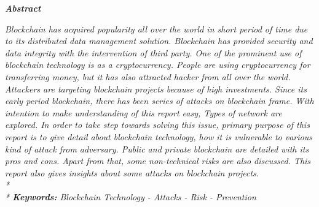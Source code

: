 \documentclass[a4paper,twoside,12pt]{report}
\begin{document}
\begin{spacing}{1.5}
\tableofcontents
\listoftables
\listoffigures
\end{spacing}
\newpage
\begin{spacing}{1}  %
\begingroup
\fontsize{12pt}{14pt}\selectfont
\begin{center}
	\Huge\bfseries
	\textit{Abstract}
\end{center}
\vspace{0.3in}
\textit{\fontsize{10}{10}\selectfont Blockchain has acquired popularity all over the world in short period of time due to its distributed data management solution. Blockchain has provided security and data integrity with the intervention of third party. One of the prominent use of blockchain technology is as a cryptocurrency. People are using cryptocurrency for transferring money, but it has also attracted hacker from all over the world. Attackers are targeting blockchain projects because of high investments. Since its early period blockchain, there has been series of attacks on blockchain frame. With intention to make understanding of this report easy, Types of network are explored. In order to take step towards solving this issue, primary purpose of this report is to give detail about blockchain technology, how it is vulnerable to various kind of attack from adversary. Public and private blockchain are detailed with its pros and cons. Apart from that, some non-technical risks are also discussed. This report also gives insights about some attacks on blockchain projects.   
\\*
\\*
\textbf{Keywords:} Blockchain Technology - Attacks - Risk - Prevention 
}
\endgroup
\end{spacing}
\end{document}
